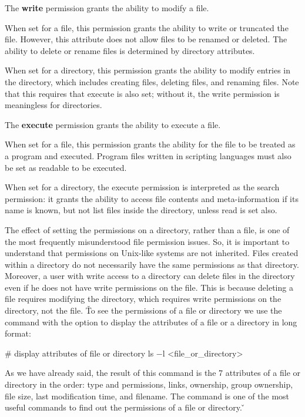 The \textbf{write} permission grants the ability to modify a file.
\ed

\bit
\item When set for a file, this permission grants the ability to write or truncated the file. However, this attribute
does not allow files to be renamed or deleted. The ability to delete or rename files is determined by directory
attributes.
\item When set for a directory, this permission grants the ability to modify entries in the directory, which includes
creating files, deleting files, and renaming files. Note that this requires that execute is also set; without it, the
write permission is meaningless for directories.
\eit

The \textbf{execute} permission grants the ability to execute a file.
\ed

\bit
\item When set for a file, this permission grants the ability for the file to be treated as a program and executed.
Program files written in scripting languages must also be set as readable to be executed.
\item When set for a directory, the execute permission is interpreted as the search permission: it grants the ability to
access file contents and meta-information if its name is known, but not list files inside the directory, unless read is
set also.
\eit

The effect of setting the permissions on a directory, rather than a file, is one of the most frequently misunderstood
file permission issues. So, it is important to understand that permissions on Unix-like systems are not inherited.
Files created within a directory do not necessarily have the same permissions as that directory. Moreover, a user with
write access to a directory can delete files in the directory even if he does not have write permissions on the file.
This is because deleting a file requires modifying the directory, which requires write permissions on the directory,
not the file. \v

To see the permissions of a file or directory we use the  command with the option  to display
the attributes of a file or a directory in long format:
\begin{bash}
# display attributes of file or directory
ls $-$l <file_or_directory>
\end{bash}

As we have already said, the result of this command is the 7 attributes of a file or directory in the order: type and
permissions, links, ownership, group ownership, file size, last modification time, and filename. The  command
is one of the most useful commands to find out the permissions of a file or directory. \v

